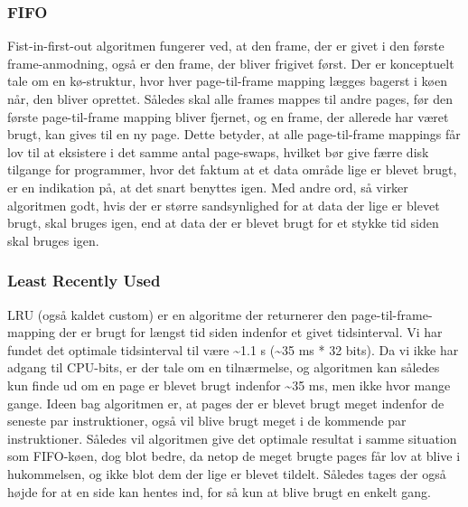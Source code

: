 	\subsubsection{FIFO}
	Fist-in-first-out algoritmen fungerer ved, at den frame, der er givet i den første frame-anmodning, også er den frame, der bliver frigivet først. Der er konceptuelt tale om en kø-struktur, hvor hver page-til-frame mapping lægges bagerst i køen når, den bliver oprettet. Således skal alle frames mappes til andre pages, før den første page-til-frame mapping bliver fjernet, og en frame, der allerede har været brugt, kan gives til en ny page. Dette betyder, at alle page-til-frame mappings får lov til at eksistere i det samme antal page-swaps, hvilket bør give færre disk tilgange for programmer, hvor det faktum at et data område lige er blevet brugt, er en indikation på, at det snart benyttes igen. Med andre ord, så virker algoritmen godt, hvis der er større sandsynlighed for at data der lige er blevet brugt, skal bruges igen, end at data der er blevet brugt for et stykke tid siden skal bruges igen.

	\subsubsection{Least Recently Used}
	LRU (også kaldet custom) er en algoritme der returnerer den page-til-frame-mapping der er brugt for længst tid siden indenfor et givet tidsinterval.  Vi har fundet det optimale tidsinterval til være \textasciitilde1.1 s (\textasciitilde35 ms * 32 bits). Da vi ikke har adgang til CPU-bits, er der tale om en tilnærmelse, og algoritmen kan således kun finde ud om en page er blevet brugt indenfor \textasciitilde35 ms, men ikke hvor mange gange. Ideen bag algoritmen er, at pages der er blevet brugt meget indenfor de seneste par instruktioner, også vil blive brugt meget i de kommende par instruktioner. Således vil algoritmen give det optimale resultat i samme situation som FIFO-køen, dog blot bedre, da netop de meget brugte pages får lov at blive i hukommelsen, og ikke blot dem der lige er blevet tildelt. Således tages der også højde for at en side kan hentes ind, for så kun at blive brugt en enkelt gang.


